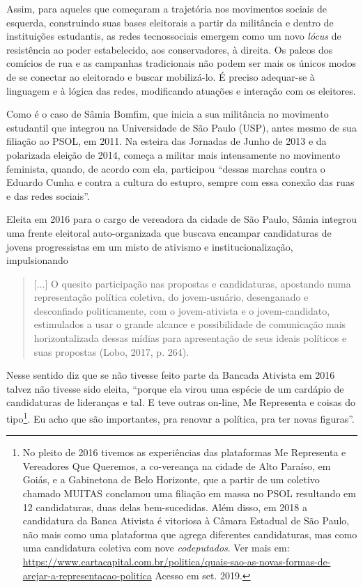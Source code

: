 Assim, para aqueles que começaram a trajetória nos movimentos sociais de
esquerda, construindo suas bases eleitorais a partir da militância e
dentro de instituições estudantis, as redes tecnossociais emergem como
um novo \emph{lócus} de resistência ao poder estabelecido, aos
conservadores, à direita. Os palcos dos comícios de rua e as campanhas
tradicionais não podem ser mais os únicos modos de se conectar ao
eleitorado e buscar mobilizá-lo. É preciso adequar-se à linguagem e à
lógica das redes, modificando atuações e interação com os eleitores.

Como é o caso de Sâmia Bomfim, que inicia a sua militância no movimento
estudantil que integrou na Universidade de São Paulo (USP), antes mesmo
de sua filiação ao PSOL, em 2011. Na esteira das Jornadas de Junho de
2013 e da polarizada eleição de 2014, começa a militar mais intensamente
no movimento feminista, quando, de acordo com ela, participou ``dessas
marchas contra o Eduardo Cunha e contra a cultura do estupro, sempre com
essa conexão das ruas e das redes sociais''.

Eleita em 2016 para o cargo de vereadora da cidade de São Paulo, Sâmia
integrou uma frente eleitoral auto-organizada que buscava encampar
candidaturas de jovens progressistas em um misto de ativismo e
institucionalização, impulsionando

\begin{quote}
{[}...{]} O quesito participação nas propostas e candidaturas, apostando
numa representação política coletiva, do jovem-usuário, desenganado e
desconfiado politicamente, com o jovem-ativista e o jovem-candidato,
estimulados a usar o grande alcance e possibilidade de comunicação mais
horizontalizada dessas mídias para apresentação de seus ideais políticos
e suas propostas (Lobo, 2017, p. 264).
\end{quote}

Nesse sentido diz que se não tivesse feito parte da Bancada Ativista em
2016 talvez não tivesse sido eleita, ``porque ela virou uma espécie de
um cardápio de candidaturas de lideranças e tal. E teve outras on-line,
Me Representa e coisas do tipo\footnote{No pleito de 2016 tivemos as
  experiências das plataformas Me Representa e Vereadores Que Queremos,
  a co-vereança na cidade de Alto Paraíso, em Goiás, e a Gabinetona de
  Belo Horizonte, que a partir de um coletivo chamado MUITAS conclamou
  uma filiação em massa no PSOL resultando em 12 candidaturas, duas
  delas bem-sucedidas. Além disso, em 2018 a candidatura da Banca
  Ativista é vitoriosa à Câmara Estadual de São Paulo, não mais como uma
  plataforma que agrega diferentes candidaturas, mas como uma
  candidatura coletiva com nove \emph{codeputados}. Ver mais em:
  \url{https://www.cartacapital.com.br/politica/quais-sao-as-novas-formas-de-arejar-a-representacao-politica}
  Acesso em set. 2019.}. Eu acho que são importantes, pra renovar a
política, pra ter novas figuras''.

